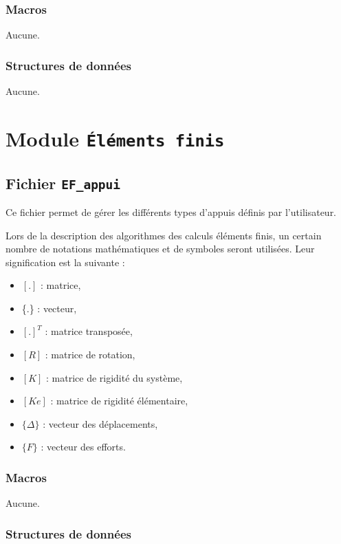\documentclass{article}
\begin{document}
\subsubsection{Macros}
Aucune.
\subsubsection{Structures de données}
Aucune.


\section{Module {\texttt{Éléments finis}}}
\subsection{Fichier {\texttt{EF\_appui}}}
Ce fichier permet de gérer les différents types d'appuis définis par l'utilisateur.\par
Lors de la description des algorithmes des calculs éléments finis, un certain nombre de notations mathématiques et de symboles seront utilisées. Leur signification est la suivante :
\begin{itemize}
\item $[.]$ : matrice,
\item \{.\} : vecteur,
\item $[.]^T$ : matrice transposée,
\item $[R]$ : matrice de rotation,
\item $[K]$ : matrice de rigidité du système,
\item $[Ke]$ : matrice de rigidité élémentaire,
\item $\{\Delta\}$ : vecteur des déplacements,
\item $\{F\}$ : vecteur des efforts.
\end{itemize}
\subsubsection{Macros}
Aucune.
\subsubsection{Structures de données}









\end{document}
